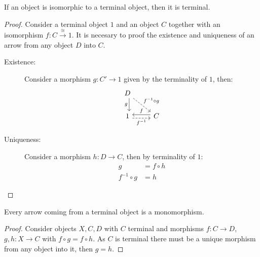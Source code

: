 \begin{theorem}\label{thm:iso_then_terminal}
  If an object is isomorphic to a terminal object, then it is terminal.

  \begin{proof}
    Consider a terminal object $1$ and an object $C$ together with an
    isomorphism $f:C\overset{\cong}{\to} 1$. It is necesary to proof the existence and uniqueness of an arrow from any object $D$ into $C$.

    \begin{description}
      \item[Existence:]
        Consider a morphism $g:C'\to 1$ given by the terminality of $1$, then:
        \[\begin{tikzcd}[ampersand replacement=\&]
          D \\
          1 \& C
          \arrow["f"', shift right=1, from=2-2, to=2-1]
          \arrow["{f^{-1}}"', shift right=1, dashed, from=2-1, to=2-2]
          \arrow["g"', shift left=1, from=1-1, to=2-1]
          \arrow["{f^{-1}\circ g}", dashed, from=1-1, to=2-2]
        \end{tikzcd}\]
        \vspace{-\baselineskip}
      \item[Uniqueness:]
        Consider a morphism $h:D \to C$, then by terminality of $1$:
        \[
          \begin{aligned}
            g &= f \circ h\\
            f^{-1} \circ g &= h
          \end{aligned}
        \]
    \end{description}
  \end{proof}
  \vspace{-1\baselineskip}
\end{theorem}

\begin{theorem}\label{thm:terminal_object_mono}
  Every arrow coming from a terminal object is a monomorphism.

  \begin{proof}
    Consider objects $X,C,D$ with $C$ terminal and morphisms $f:C\to D$,
    $g,h:X\to C$ with $f\circ g = f\circ h$. As $C$ is terminal there must be a
    unique morphism from any object into it, then $g=h$.
  \end{proof}
\end{theorem}

